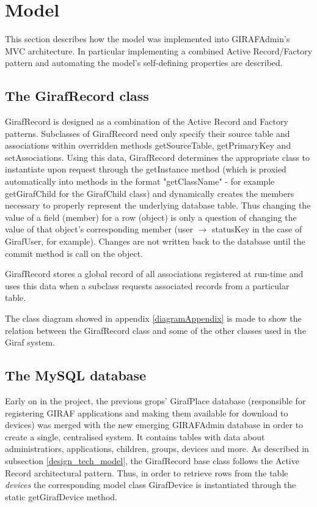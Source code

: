 \section{Model}
\label{model}
This section describes how the model was implemented into GIRAFAdmin's MVC architecture. In particular implementing a combined Active Record/Factory pattern and automating the model's self-defining properties are described.

\subsection{The GirafRecord class}
GirafRecord is designed as a combination of the Active Record and Factory patterns. Subclasses of GirafRecord need only specify their source table and associations within overridden methods getSourceTable, getPrimaryKey and setAssociations. Using this data, GirafRecord determines the appropriate class to instantiate upon request through the getInstance method (which is proxied automatically into methods in the format "getClassName" - for example getGirafChild for the GirafChild class) and dynamically creates the members necessary to properly represent the underlying database table. Thus changing the value of a field (member) for a row (object) is only a question of changing the value of that object's corresponding member (user $\rightarrow$ statusKey in the case of GirafUser, for example). Changes are not written back to the database until the commit method is call on the object.

GirafRecord stores a global record of all associations registered at run-time and uses this data when a subclass requests associated records from a particular table.

The class diagram showed in appendix \ref{diagramAppendix} is made to show the relation between the GirafRecord class and some of the other classes used in the Giraf system.

\subsection{The MySQL database}
Early on in the project, the previous grops' GirafPlace database (responsible for registering GIRAF applications and making them available for download to devices) was merged with the new emerging GIRAFAdmin database in order to create a single, centralised system. It contains tables with data about administratiors, applications, children, groups, devices and more.
As described in subsection \vref{design_tech_model}, the GirafRecord base class follows the Active Record architectural pattern. Thus, in order to retrieve rows from the table \emph{devices} the corresponding model class GirafDevice is instantiated through the static getGirafDevice method.

